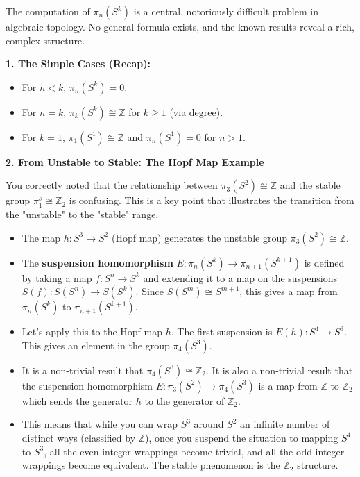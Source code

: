 \begin{remark}
The computation of $\pi_n(S^k)$ is a central, notoriously difficult problem in algebraic topology. No general formula exists, and the known results reveal a rich, complex structure.

\textbf{1. The Simple Cases (Recap):}
\begin{itemize}
    \item For $n < k$, $\pi_n(S^k) = 0$.
    \item For $n = k$, $\pi_k(S^k) \cong \mathbb{Z}$ for $k \ge 1$ (via degree).
    \item For $k = 1$, $\pi_1(S^1) \cong \mathbb{Z}$ and $\pi_n(S^1)=0$ for $n>1$.
\end{itemize}

\textbf{2. From Unstable to Stable: The Hopf Map Example}

You correctly noted that the relationship between $\pi_3(S^2) \cong \mathbb{Z}$ and the stable group $\pi_1^s \cong \mathbb{Z}_2$ is confusing. This is a key point that illustrates the transition from the "unstable" to the "stable" range.
\begin{itemize}
    \item The map $h: S^3 \to S^2$ (Hopf map) generates the unstable group $\pi_3(S^2) \cong \mathbb{Z}$.
    \item The \textbf{suspension homomorphism} $E: \pi_n(S^k) \to \pi_{n+1}(S^{k+1})$ is defined by taking a map $f: S^n \to S^k$ and extending it to a map on the suspensions $S(f): S(S^n) \to S(S^k)$. Since $S(S^m) \cong S^{m+1}$, this gives a map from $\pi_n(S^k)$ to $\pi_{n+1}(S^{k+1})$.
    \item Let's apply this to the Hopf map $h$. The first suspension is $E(h): S^4 \to S^3$. This gives an element in the group $\pi_4(S^3)$.
    \item It is a non-trivial result that $\pi_4(S^3) \cong \mathbb{Z}_2$. It is also a non-trivial result that the suspension homomorphism $E: \pi_3(S^2) \to \pi_4(S^3)$ is a map from $\mathbb{Z}$ to $\mathbb{Z}_2$ which sends the generator $h$ to the generator of $\mathbb{Z}_2$.
    \item This means that while you can wrap $S^3$ around $S^2$ an infinite number of distinct ways (classified by $\mathbb{Z}$), once you suspend the situation to mapping $S^4$ to $S^3$, all the even-integer wrappings become trivial, and all the odd-integer wrappings become equivalent. The stable phenomenon is the $\mathbb{Z}_2$ structure.
\end{itemize}


\end{remark}
